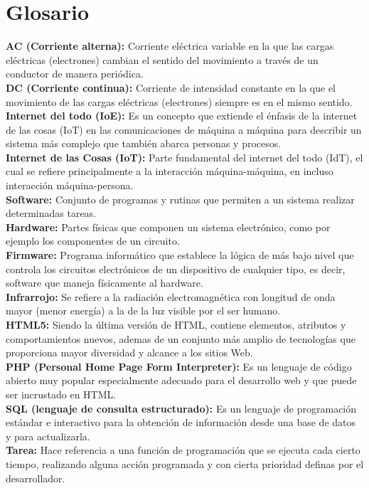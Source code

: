 \chapter*{Glosario}

\textbf{AC (Corriente alterna):} Corriente eléctrica variable en la que las cargas eléctricas (electrones) cambian el sentido del movimiento a través de un conductor de manera periódica.\\

\textbf{DC (Corriente continua):} Corriente de intensidad constante en la que el movimiento de las cargas eléctricas (electrones) siempre es en el mismo sentido.\\

\textbf{Internet del todo (IoE):} Es un concepto que extiende el énfasis de la internet de las cosas (IoT) en las comunicaciones de máquina a máquina para describir un sistema más complejo que también abarca personas y procesos.\cite{IOE} \\

\textbf{Internet de las Cosas (IoT):} Parte fundamental del internet del todo (IdT), el cual se refiere principalmente a la interacción máquina-máquina, en incluso interacción máquina-persona.\\

\textbf{Software:} Conjunto de programas y rutinas que permiten a un sistema realizar determinadas tareas.\\

\textbf{Hardware:} Partes físicas que componen un sistema electrónico, como por ejemplo los componentes de un circuito.\\

\textbf{Firmware:} Programa informático que establece la lógica de más bajo nivel que controla los circuitos electrónicos de un dispositivo de cualquier tipo, es decir, software que maneja físicamente al hardware.\\

\textbf{Infrarrojo:} Se refiere a la radiación electromagnética con longitud de onda mayor (menor energía) a la de la luz visible por el ser humano.\\

\textbf{HTML5:} Siendo la última versión de HTML, contiene elementos, atributos y comportamientos nuevos, ademas de un conjunto más amplio de tecnologías que proporciona mayor diversidad y alcance a los sitios Web. \\

\textbf{PHP (Personal Home Page Form Interpreter):} Es un lenguaje de código abierto muy popular especialmente adecuado para el desarrollo web y que puede ser incrustado en HTML.\\

\textbf{SQL (lenguaje de consulta estructurado):} Es un lenguaje de programación estándar e interactivo para la obtención de información desde una base de datos y para actualizarla.\\

\textbf{Tarea:} Hace referencia a una función de programación que se ejecuta cada cierto tiempo, realizando alguna acción programada y con cierta prioridad definas por el desarrollador.